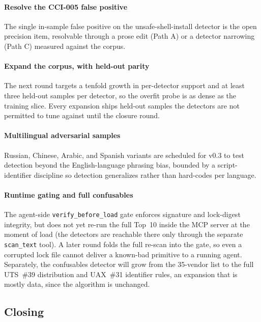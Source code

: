 \paragraph{Resolve the CCI-005 false positive} The single in-sample
false positive on the unsafe-shell-install detector is the open
precision item, resolvable through a prose edit (Path A) or a detector
narrowing (Path C) measured against the corpus.

\paragraph{Expand the corpus, with held-out parity} The next round
targets a tenfold growth in per-detector support and at least three
held-out samples per detector, so the overfit probe is as dense as the
training slice. Every expansion ships held-out samples the detectors are
not permitted to tune against until the closure round.

\paragraph{Multilingual adversarial samples} Russian, Chinese, Arabic,
and Spanish variants are scheduled for v0.3 to test detection beyond the
English-language phrasing bias, bounded by a script-identifier
discipline so detection generalizes rather than hard-codes per language.

\paragraph{Runtime gating and full confusables} The agent-side
\texttt{verify\_before\_load} gate enforces signature and lock-digest
integrity, but does not yet re-run the full Top~10 inside the MCP server
at the moment of load (the detectors are reachable there only through
the separate \texttt{scan\_text} tool). A later round folds the full
re-scan into the gate, so even a corrupted lock file cannot deliver a
known-bad primitive to a running agent. Separately, the confusables
detector will grow from the 35-vendor list to the full UTS~\#39
distribution and UAX~\#31 identifier rules, an expansion that is mostly
data, since the algorithm is unchanged.

\subsection{Closing}

